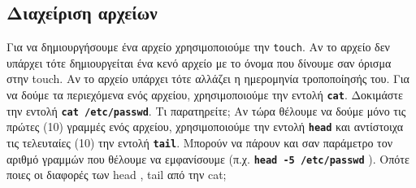 \subsection{Διαχείριση αρχείων}
Για να δημιουργήσουμε ένα αρχείο χρησιμοποιούμε την \texttt{touch}. Αν το αρχείο δεν υπάρχει τότε δημιουργείται ένα κενό αρχείο με το όνομα που δίνουμε σαν όρισμα στην touch. Αν το αρχείο υπάρχει τότε αλλάζει η ημερομηνία τροποποίησής του. 
Για να δούμε τα περιεχόμενα ενός αρχείου, χρησιμοποιούμε την εντολή \textbf{\texttt{cat}}. Δοκιμάστε την εντολή 
\textbf{\texttt{cat /etc/passwd}}. Τι παρατηρείτε;
Αν τώρα θέλουμε να δούμε μόνο τις πρώτες (10) γραμμές ενός αρχείου, χρησιμοποιούμε την εντολή \textbf{\texttt{head}} και αντίστοιχα τις
τελευταίες (10) την εντολή \textbf{\texttt{tail}}. Μπορούν να πάρουν και σαν παράμετρο τον αριθμό γραμμών που θέλουμε να εμφανίσουμε (π.χ. \textbf{\texttt{head -5 /etc/passwd}} ).
Οπότε ποιες οι διαφορές των head , tail από την cat;

